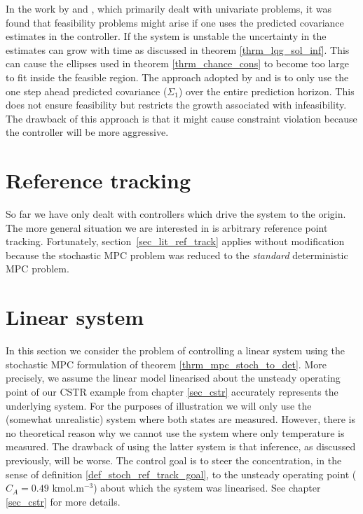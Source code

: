 In the work by \cite{yan1} and \cite{yan2}, which primarily dealt with univariate problems, it was found that feasibility problems might arise if one uses the predicted covariance estimates in the controller. If the system is unstable the uncertainty in the estimates can grow with time as discussed in theorem \ref{thrm_lqg_sol_inf}. This can cause the ellipses used in theorem \ref{thrm_chance_cons} to become too large to fit inside the feasible region. The approach adopted by \cite{yan1} and \cite{yan2} is to only use the one step ahead predicted covariance ($\Sigma_1$) over the entire prediction horizon. This does not ensure feasibility but restricts the growth associated with infeasibility. The drawback of this approach is that it might cause constraint violation because the controller will be more aggressive.  

\section{Reference tracking}
So far we have only dealt with controllers which drive the system to the origin. The more general situation we are interested in is arbitrary reference point tracking. Fortunately, section~\ref{sec_lit_ref_track} applies without modification because the stochastic MPC problem was reduced to the \textit{standard} deterministic MPC problem. 

\section{Linear system}
\label{sec_lin_sys_cont}
In this section we consider the problem of controlling a linear system using the stochastic MPC formulation of theorem \ref{thrm_mpc_stoch_to_det}. More precisely, we assume the linear model linearised about the unsteady operating point of our CSTR example from chapter \ref{sec_cstr} accurately represents the underlying system. For the purposes of illustration we will only use the (somewhat unrealistic) system where both states are measured. However, there is no theoretical reason why we cannot use the system where only temperature is measured. The drawback of using the latter system is that inference, as discussed previously, will be worse. The control goal is to steer the concentration, in the sense of definition \ref{def_stoch_ref_track_goal}, to the unsteady operating point ($C_A = 0.49$ kmol.m$^{-3}$) about which the system was linearised. See chapter \ref{sec_cstr} for more details.

